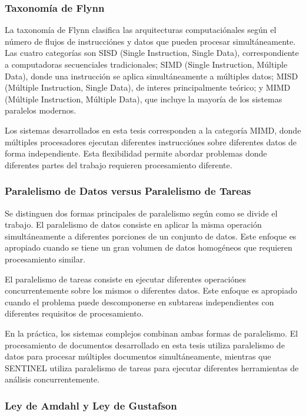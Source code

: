 \documentclass[12pt,a4paper,twoside]{book}
\begin{document}
\subsubsection{Taxonomía de Flynn}

La taxonomía de Flynn clasifica las arquitecturas computaciónales según el número de flujos de instrucciónes y datos que pueden procesar simultáneamente. Las cuatro categorías son SISD (Single Instruction, Single Data), correspondiente a computadoras secuenciales tradicionales; SIMD (Single Instruction, Múltiple Data), donde una instrucción se aplica simultáneamente a múltiples datos; MISD (Múltiple Instruction, Single Data), de interes principalmente teórico; y MIMD (Múltiple Instruction, Múltiple Data), que incluye la mayoría de los sistemas paralelos modernos.

Los sistemas desarrollados en esta tesis corresponden a la categoría MIMD, donde múltiples procesadores ejecutan diferentes instrucciónes sobre diferentes datos de forma independiente. Esta flexibilidad permite abordar problemas donde diferentes partes del trabajo requieren procesamiento diferente.

\subsubsection{Paralelismo de Datos versus Paralelismo de Tareas}

Se distinguen dos formas principales de paralelismo según como se divide el trabajo. El paralelismo de datos consiste en aplicar la misma operación simultáneamente a diferentes porciones de un conjunto de datos. Este enfoque es apropiado cuando se tiene un gran volumen de datos homogéneos que requieren procesamiento similar.

El paralelismo de tareas consiste en ejecutar diferentes operaciónes concurrentemente sobre los mismos o diferentes datos. Este enfoque es apropiado cuando el problema puede descomponerse en subtareas independientes con diferentes requisitos de procesamiento.

En la práctica, los sistemas complejos combinan ambas formas de paralelismo. El procesamiento de documentos desarrollado en esta tesis utiliza paralelismo de datos para procesar múltiples documentos simultáneamente, mientras que SENTINEL utiliza paralelismo de tareas para ejecutar diferentes herramientas de análisis concurrentemente.

\subsubsection{Ley de Amdahl y Ley de Gustafson}
\end{document}
